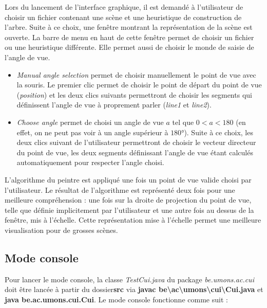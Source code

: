\documentclass[11pt,a4paper]{article}
\theoremstyle{definition}
\theoremstyle{remark}
\begin{document}
Lors du lancement de l'interface graphique, il est demandé à l'utilisateur de choisir un fichier contenant une scène et une heuristique de construction de l'arbre. Suite à ce choix, une fenêtre montrant la représentation de la scène est ouverte. La barre de menu en haut de cette fenêtre permet de choisir un fichier ou une heuristique différente. Elle permet aussi de choisir le monde de  saisie de l'angle de vue.\\

\begin{itemize}
	\item \emph{Manual angle selection} permet de choisir manuellement le point de vue avec la souris. Le premier clic permet de choisir le point de départ du point de vue (\emph{position}) et les deux clics suivants permettront de choisir les segments qui définissent l'angle de vue à proprement parler (\emph{line1} et \emph{line2}).
	\item \emph{Choose angle} permet de choisi un angle de vue $a$ tel que $0<a<180$ (en effet, on ne peut pas voir à un angle supérieur à $180°$). Suite à ce choix, les deux clics suivant de l'utilisateur permettront de choisir le vecteur directeur du point de vue, les deux segments définissant l'angle de vue étant calculés automatiquement pour respecter l'angle choisi.
\end{itemize}
\vspace{20}

L'algorithme du peintre est appliqué une fois un point de vue valide choisi par l'utilisateur. Le résultat de l'algorithme est représenté deux fois pour une meilleure compréhension : une fois sur la droite de projection du point de vue, telle que définie implicitement par l'utilisateur et une autre fois au dessus de la fenêtre, mis à l'échelle. Cette représentation mise à l'échelle permet une meilleure visualisation pour de grosses scènes.

\subsection{Mode console}

Pour lancer le mode console, la classe \textit{TestCui.java} du package \textit{be.umons.ac.cui} doit être lancée à partir du dossier\textbf{src} via \textbf{javac be\textbackslash ac\textbackslash umons\textbackslash cui\textbackslash Cui.java} et \textbf{java be.ac.umons.cui.Cui}. Le mode console fonctionne comme suit :\\
\end{document}
